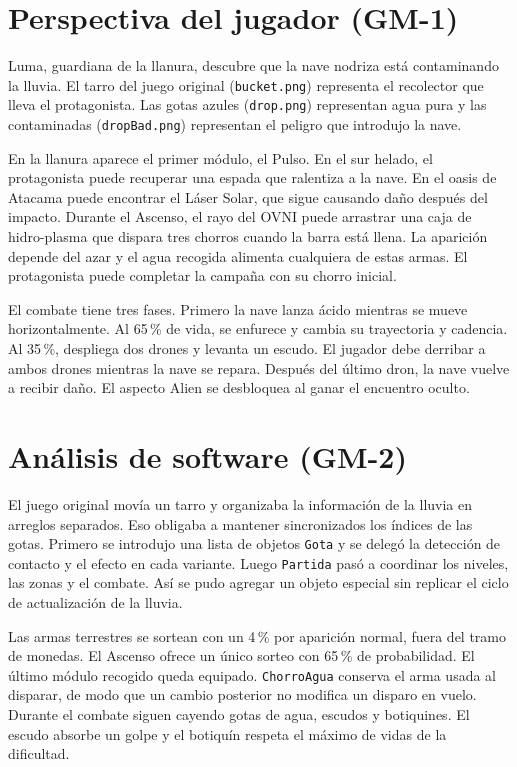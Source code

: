 \section{Perspectiva del jugador (GM-1)}
Luma, guardiana de la llanura, descubre que la nave nodriza está contaminando la lluvia. El tarro del juego original (\texttt{bucket.png}) representa el recolector que lleva el protagonista. Las gotas azules (\texttt{drop.png}) representan agua pura y las contaminadas (\texttt{dropBad.png}) representan el peligro que introdujo la nave.

En la llanura aparece el primer módulo, el Pulso. En el sur helado, el protagonista puede recuperar una espada que ralentiza a la nave. En el oasis de Atacama puede encontrar el Láser Solar, que sigue causando daño después del impacto. Durante el Ascenso, el rayo del OVNI puede arrastrar una caja de hidro-plasma que dispara tres chorros cuando la barra está llena. La aparición depende del azar y el agua recogida alimenta cualquiera de estas armas. El protagonista puede completar la campaña con su chorro inicial.

El combate tiene tres fases. Primero la nave lanza ácido mientras se mueve horizontalmente. Al 65\,\% de vida, se enfurece y cambia su trayectoria y cadencia. Al 35\,\%, despliega dos drones y levanta un escudo. El jugador debe derribar a ambos drones mientras la nave se repara. Después del último dron, la nave vuelve a recibir daño. El aspecto Alien se desbloquea al ganar el encuentro oculto.

\section{Análisis de software (GM-2)}
El juego original movía un tarro y organizaba la información de la lluvia en arreglos separados. Eso obligaba a mantener sincronizados los índices de las gotas. Primero se introdujo una lista de objetos \texttt{Gota} y se delegó la detección de contacto y el efecto en cada variante. Luego \texttt{Partida} pasó a coordinar los niveles, las zonas y el combate. Así se pudo agregar un objeto especial sin replicar el ciclo de actualización de la lluvia.

Las armas terrestres se sortean con un 4\,\% por aparición normal, fuera del tramo de monedas. El Ascenso ofrece un único sorteo con 65\,\% de probabilidad. El último módulo recogido queda equipado. \texttt{ChorroAgua} conserva el arma usada al disparar, de modo que un cambio posterior no modifica un disparo en vuelo. Durante el combate siguen cayendo gotas de agua, escudos y botiquines. El escudo absorbe un golpe y el botiquín respeta el máximo de vidas de la dificultad.

